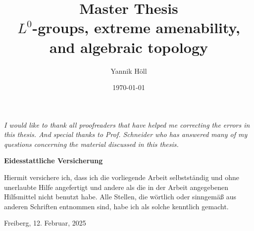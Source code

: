 \documentclass[a4paper, 12pt, twoside]{article}
\title{Master Thesis\\{$L^0$-groups, extreme amenability, and algebraic topology}}
\author{Yannik Höll}
\date{\today}
\theoremstyle{break}
\theoremstyle{break}
\begin{document}
\begin{titlingpage}
    \maketitle
\end{titlingpage}
\clearpage

\vspace*{\fill}
\begin{center}
\textit{
    I would like to thank all proofreaders that have helped me correcting the errors in this thesis. 
    And special thanks to Prof. Schneider who has answered many of my questions concerning the material discussed in this thesis.  
}
\end{center}
\vspace*{\fill}
\thispagestyle{empty}
\clearpage

\tableofcontents
\vspace*{11cm}
\pagebreak

\printnomenclature
\pagebreak

\nocite{*}







\appendix

\clearpage

\vspace*{\fill}
\noindent
\textbf{Eidesstattliche Versicherung}

\noindent
Hiermit versichere ich, dass ich die vorliegende Arbeit selbstständig und ohne unerlaubte Hilfe angefertigt und andere als die in der Arbeit angegebenen Hilfsmittel nicht benutzt habe. Alle Stellen, die wörtlich oder sinngemäß aus anderen Schriften entnommen sind, habe ich als solche kenntlich gemacht.
\vspace*{50px}

\noindent
Freiberg, 12. Februar, 2025  
\vspace*{\fill}

\clearpage
\printbibliography
\end{document}
